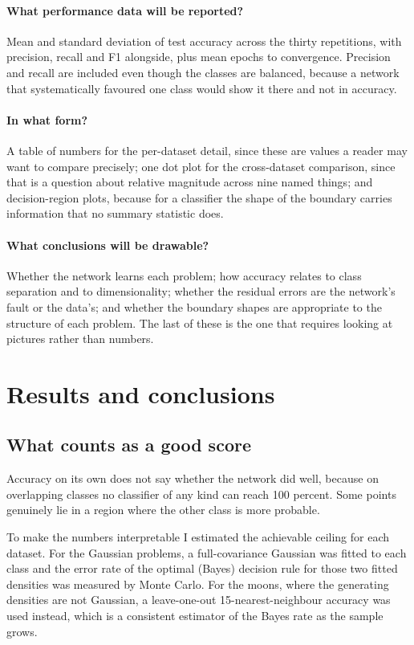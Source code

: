 \documentclass[11pt]{article}
\begin{document}
\paragraph{What performance data will be reported?}
Mean and standard deviation of test accuracy across the thirty repetitions, with
precision, recall and F1 alongside, plus mean epochs to convergence. Precision
and recall are included even though the classes are balanced, because a network
that systematically favoured one class would show it there and not in accuracy.

\paragraph{In what form?}
A table of numbers for the per-dataset detail, since these are values a reader
may want to compare precisely; one dot plot for the cross-dataset comparison,
since that is a question about relative magnitude across nine named things; and
decision-region plots, because for a classifier the shape of the boundary
carries information that no summary statistic does.

\paragraph{What conclusions will be drawable?}
Whether the network learns each problem; how accuracy relates to class
separation and to dimensionality; whether the residual errors are the
network's fault or the data's; and whether the boundary shapes are appropriate
to the structure of each problem. The last of these is the one that requires
looking at pictures rather than numbers.

\section{Results and conclusions}
\label{sec:results}

\subsection{What counts as a good score}

Accuracy on its own does not say whether the network did well, because on
overlapping classes no classifier of any kind can reach 100 percent. Some points
genuinely lie in a region where the other class is more probable.

To make the numbers interpretable I estimated the achievable ceiling for each
dataset. For the Gaussian problems, a full-covariance Gaussian was fitted to
each class and the error rate of the optimal (Bayes) decision rule for those two
fitted densities was measured by Monte Carlo. For the moons, where the
generating densities are not Gaussian, a leave-one-out 15-nearest-neighbour
accuracy was used instead, which is a consistent estimator of the Bayes rate as
the sample grows.
\end{document}
